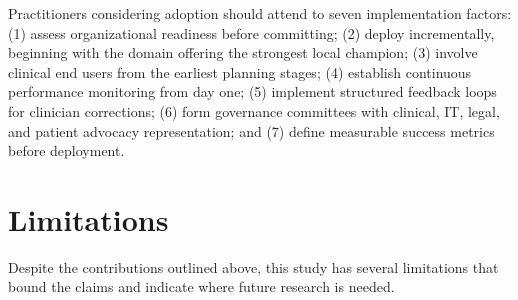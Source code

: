 Practitioners considering adoption should attend to seven implementation factors: (1) assess organizational readiness before committing; (2) deploy incrementally, beginning with the domain offering the strongest local champion; (3) involve clinical end users from the earliest planning stages; (4) establish continuous performance monitoring from day one; (5) implement structured feedback loops for clinician corrections; (6) form governance committees with clinical, IT, legal, and patient advocacy representation; and (7) define measurable success metrics before deployment.


\section{Limitations}
\label{sec:ch9_limitations}

Despite the contributions outlined above, this study has several limitations that bound the claims and indicate where future research is needed.

